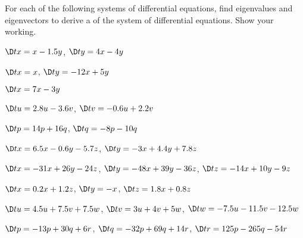 \begin{exercise} \label{ex:} 
For each of the following systems of differential equations, find eigenvalues and eigenvectors to derive a  of the system of differential equations.  Show your working.

\begin{parts}
\item \(\D tx=x-1.5y\), \(\D ty=4x-4y\)

\item \(\D tx=x\), \(\D ty=-12x+5y\)

\item \(\D tx=7x-3y\)

\item \(\D tu=2.8u-3.6v\), \(\D tv=-0.6u+2.2v\)

\item \(\D tp=14p+16q\), \(\D tq=-8p-10q\)

\item \(\D tx=6.5x-0.6y-5.7z\), \(\D ty=-3x+4.4y+7.8z\)%

\item \(\D tx=-31x+26y-24z\), \(\D ty=-48x+39y-36z\), \(\D tz=-14x+10y-9z\)

\item \(\D tx=0.2x+1.2z\), \(\D ty=-x\), \(\D tz=1.8x+0.8z\)

\item \(\D tu=4.5u+7.5v+7.5w\), \(\D tv=3u+4v+5w\), \(\D tw=-7.5u-11.5v-12.5w\)

\item \(\D tp=-13p+30q+6r\), \(\D tq=-32p+69q+14r\), \(\D tr=125p-265q-54r\)

\end{parts}
\end{exercise}





